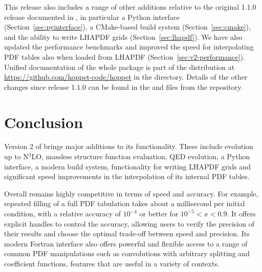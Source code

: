 \documentclass[preprint,1p,a4paper,11pt]{elsarticle}
\begin{document}
This release also includes a range of other additions relative
to the original 1.1.0 release documented in \cite{Salam:2008qg}, in
particular a Python interface
(Section~\ref{sec:pyinterface}), a CMake-based build system
(Section~\ref{sec:cmake}), and the ability to write LHAPDF grids
(Section~\ref{sec:lhapdf}).
%
We have also updated the performance benchmarks and improved the speed
for interpolating PDF tables also when loaded from LHAPDF (Section~\ref{sec:v2-performance}).
%
Unified documentation of the whole \hoppet package is part of the
distribution at \url{https://github.com/hoppet-code/hoppet} in the
 directory.
%
Details of the other changes since release 1.1.0 can be found in the
 and  files from the
repository.\medskip

\noindent {}



\section{Conclusion}

Version 2 of \hoppet brings major additions to its functionality.
%
These include evolution up to N$^3$LO, massless structure function
evaluation, QED evolution, a Python interface, a modern build system,
functionality for writing LHAPDF grids and significant speed
improvements in the interpolation of its internal PDF tables.

Overall \hoppet remains highly competitive in terms of speed and
accuracy.
%
For example, repeated filling of a full PDF tabulation takes about a
millisecond per initial condition, with a relative accuracy of
$10^{-4}$ or better for $10^{-5} < x<0.9$.
%
It offers explicit handles to control the accuracy, allowing users to
verify the precision of their results and choose the optimal trade-off
between speed and precision.
%
Its modern Fortran interface also offers powerful and flexible access
to a range of common PDF manipulations such as convolutions with
arbitrary splitting and coefficient functions, features that are
useful in a variety of contexts.
\end{document}
